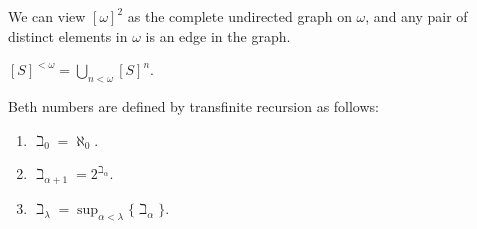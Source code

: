 \begin{example}
    We can view $[\omega]^2$ as the complete undirected graph on $\omega$, and any pair of distinct elements in $\omega$ is an edge in the graph.
\end{example}


\begin{notation}
    $[S]^{<\omega}= \bigcup_{n<\omega}[S]^n$.
\end{notation}


\begin{definition}
    Beth numbers are defined by transfinite recursion as follows:
    \begin{enumerate}
        \item $\beth_0=\aleph_0$.
        \item $\beth_{\alpha+1}= 2^{\beth_\alpha}$.
        \item $\beth_\lambda=\displaystyle{\sup_{\alpha<\lambda}\{\beth_\alpha}\}$.
    \end{enumerate}
\end{definition}